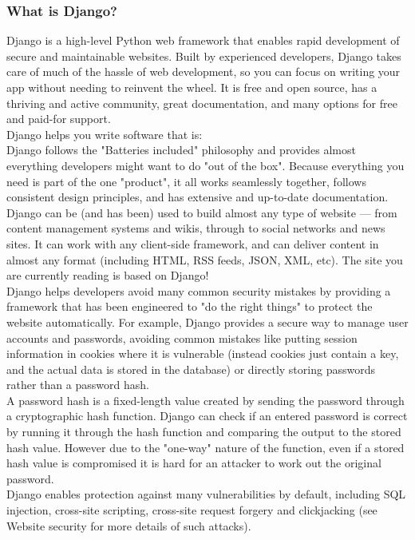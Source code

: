 \subsubsection{What is Django?}
Django is a high-level Python web framework that enables rapid development of secure and maintainable websites. Built by experienced developers, Django takes care of much of the hassle of web development, so you can focus on writing your app without needing to reinvent the wheel. It is free and open source, has a thriving and active community, great documentation, and many options for free and paid-for support. \\

Django helps you write software that is:
\\
Django follows the "Batteries included" philosophy and provides almost everything developers might want to do "out of the box". Because everything you need is part of the one "product", it all works seamlessly together, follows consistent design principles, and has extensive and up-to-date documentation.\\
Django can be (and has been) used to build almost any type of website — from content management systems and wikis, through to social networks and news sites. It can work with any client-side framework, and can deliver content in almost any format (including HTML, RSS feeds, JSON, XML, etc). The site you are currently reading is based on Django!\\
Django helps developers avoid many common security mistakes by providing a framework that has been engineered to "do the right things" to protect the website automatically. For example, Django provides a secure way to manage user accounts and passwords, avoiding common mistakes like putting session information in cookies where it is vulnerable (instead cookies just contain a key, and the actual data is stored in the database) or directly storing passwords rather than a password hash.\\

A password hash is a fixed-length value created by sending the password through a cryptographic hash function. Django can check if an entered password is correct by running it through the hash function and comparing the output to the stored hash value. However due to the "one-way" nature of the function, even if a stored hash value is compromised it is hard for an attacker to work out the original password.\\

Django enables protection against many vulnerabilities by default, including SQL injection, cross-site scripting, cross-site request forgery and clickjacking (see Website security for more details of such attacks).\\


